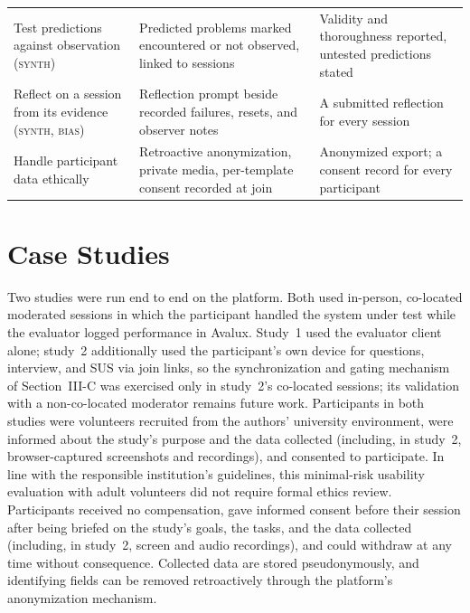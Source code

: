 \documentclass[conference]{IEEEtran}
\begin{document}
\begin{table}[t]
\begin{tabular}{@{}>{\raggedright\arraybackslash}p{}>{\raggedright\arraybackslash}p{}>{\raggedright\arraybackslash}p{}@{}}
Test predictions against observation (\textsc{synth}) & Predicted problems marked encountered or not observed, linked to sessions & Validity and thoroughness reported, untested predictions stated \\
Reflect on a session from its evidence (\textsc{synth}, \textsc{bias}) & Reflection prompt beside recorded failures, resets, and observer notes & A submitted reflection for every session \\
Handle participant data ethically & Retroactive anonymization, private media, per-template consent recorded at join & Anonymized export; a consent record for every participant \\
\bottomrule
\end{tabular}
\end{table}

\section{Case Studies}
Two studies were run end to end on the platform. Both used in-person,
co-located moderated sessions in which the participant handled the system
under test while the evaluator logged performance in Avalux. Study~1 used
the evaluator client alone; study~2 additionally used the participant's
own device for questions, interview, and SUS via join links, so the
synchronization and gating mechanism of
Section~III-C was exercised only in study~2's co-located
sessions; its validation with a non-co-located moderator remains future
work. Participants in both studies were volunteers recruited from the
authors' university environment, were informed about the study's purpose
and the data collected (including, in study~2, browser-captured
screenshots and recordings), and consented to participate.
In line with the responsible institution's guidelines, this
minimal-risk usability evaluation with adult volunteers did not require
formal ethics review. Participants received no compensation, gave
informed consent before their session after being briefed on the
study's goals, the tasks, and the data collected (including, in
study~2, screen and audio recordings), and could withdraw at any time
without consequence. Collected data are stored pseudonymously, and
identifying fields can be removed retroactively through the platform's
anonymization mechanism.
\end{document}
